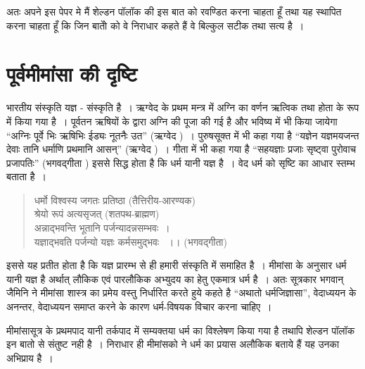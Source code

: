 अतः अपने इस पेपर मे मैं शेल्डन पॉलॉक की इस बात को रवण्डित करना चाहता हूँ तथा यह स्थापित करना चाहता हूँ कि जिन बातोें को वे निराधार कहते हैं वे बिल्कुल सटीक तथा सत्य है~।


\section*{पूर्वमीमांसा की दृष्टि}

भारतीय संस्कृति यज्ञ - संस्कृति है~। ऋग्वेद के प्रथम मन्त्र में अग्नि का वर्णन ऋत्विक तथा होता के रूप में किया गया है~। पूर्वतन ऋषियों के द्वारा अग्नि की पूजा की गई है और भविष्य में भी किया जायेगा “अग्निः पूर्वे भिः ऋषिभिः ईड्यः नूतनैः उत” (ऋग्वेद )~। पुरुषसूक्त में भी कहा गया है “यज्ञेन यज्ञमयजन्त देवाः तानि धर्माणि प्रथमानि आसन्” (ऋग्वेद )~। गीता में भी कहा गया है “सहयज्ञाः प्रजाः सृष्ट्वा पुरोवाच प्रजापतिः” (भगवद्गीता ) इससे सिद्ध होता है कि धर्म यानी यज्ञ है~। वेद धर्म को सृष्टि का आधार स्तम्भ बताता है~।

\begin{verse}
धर्मो विश्वस्य जगतः प्रतिष्ठा (तैत्तिरीय-आरण्यक)\\ श्रेयो रूपं अत्यसृजत् (शतपथ-ब्राह्मण)\\अन्नाद्भवन्ति भूतानि पर्जन्यादन्नसम्भवः~।\\यज्ञाद्भवति पर्जन्यो यज्ञः कर्मसमुद्भवः ~।। (भगवद्गीता)
\end{verse}

इससे यह प्रतीत होता है कि यज्ञ प्रारम्भ से ही हमारी संस्कृति में समाहित है~। मीमांसा के अनुसार धर्म यानी यज्ञ है अर्थात् लौकिक एवं पारलौकिक अभ्युदय का हेतु एकमात्र धर्म है~। अतः सूत्रकार भगवान् जैमिनि ने मीमांसा शास्त्र का प्रमेय वस्तु निर्धारित करते हुये कहते है “अथातो धर्मजिज्ञासा”, वेदाध्ययन के अनन्तर, वेदाध्ययन समाप्त करने के कारण धर्म-विषयक विचार करना चाहिए~।

मीमांसासूत्र के प्रथमपाद यानी तर्कपाद में सम्यक्तया धर्म का विश्लेषण किया गया है तथापि शेल्डन पॉलॉक इन बातो से संतुष्ट नही है~। निराधार ही मीमांसको ने धर्म का प्रयास अलौकिक बताये हैं यह उनका अभिप्राय है~।

\begin{myquote}

~\hfill {}
\end{myquote}

